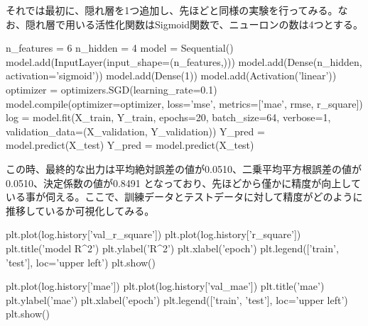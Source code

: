 \documentclass{report}
\begin{document}
それでは最初に、隠れ層を1つ追加し、先ほどと同様の実験を行ってみる。なお、隠れ層で用いる活性化関数はSigmoid関数で、ニューロンの数は4つとする。
\\

\begin{python}[caption=Sigmoid関数]
n_features = 6
n_hidden   = 4
model = Sequential()
model.add(InputLayer(input_shape=(n_features,)))
model.add(Dense(n_hidden, activation='sigmoid'))
model.add(Dense(1))
model.add(Activation('linear'))
optimizer = optimizers.SGD(learning_rate=0.1)
model.compile(optimizer=optimizer,
              loss='mse', metrics=['mae', rmse, r_square])
log = model.fit(X_train, Y_train, epochs=20, batch_size=64, 
verbose=1,
         validation_data=(X_validation, Y_validation))
Y_pred = model.predict(X_test)
Y_pred = model.predict(X_test)
\end{python}

この時、最終的な出力は平均絶対誤差の値が0.0510、二乗平均平方根誤差の値が0.0510、決定係数の値が0.8491 となっており、先ほどから僅かに精度が向上している事が伺える。ここで、訓練データとテストデータに対して精度がどのように推移しているか可視化してみる。
\\

\begin{python}[caption=Sigmoid関数を用いた学習推移]
plt.plot(log.history['val_r_square'])
plt.plot(log.history['r_square'])
plt.title('model R^2')
plt.ylabel('R^2')
plt.xlabel('epoch')
plt.legend(['train', 'test'], loc='upper left')
plt.show()

plt.plot(log.history['mae'])
plt.plot(log.history['val_mae'])
plt.title('mae')
plt.ylabel('mae')
plt.xlabel('epoch')
plt.legend(['train', 'test'], loc='upper left')
plt.show()
\end{python}
\end{document}
